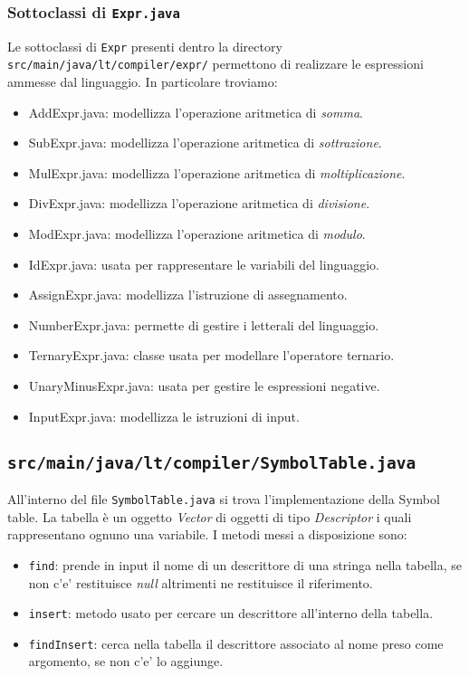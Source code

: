 \documentclass[10pt,a4paper]{article}
\begin{document}
\subsubsection{Sottoclassi di \texttt{Expr.java}}
Le sottoclassi di \texttt{Expr} presenti dentro la directory \texttt{src/main/java/lt/compiler/expr/} permettono di realizzare le espressioni ammesse dal linguaggio. In particolare troviamo:
\begin{itemize}
    \item AddExpr.java: modellizza l'operazione aritmetica di \textit{somma}.
    \item SubExpr.java: modellizza l'operazione aritmetica di \textit{sottrazione}.
    \item MulExpr.java: modellizza l'operazione aritmetica di \textit{moltiplicazione}.
    \item DivExpr.java: modellizza l'operazione aritmetica di \textit{divisione}.
    \item ModExpr.java: modellizza l'operazione aritmetica di \textit{modulo}.
    \item IdExpr.java: usata per rappresentare le variabili del linguaggio.
    \item AssignExpr.java: modellizza l'istruzione di assegnamento. 
    \item NumberExpr.java: permette di gestire i letterali del linguaggio.
    \item TernaryExpr.java: classe usata per modellare l'operatore ternario.
    \item UnaryMinusExpr.java: usata per gestire le espressioni negative. 
    \item InputExpr.java: modellizza le istruzioni di input.
\end{itemize}

\subsection{\texttt{src/main/java/lt/compiler/SymbolTable.java}}
All'interno del file \texttt{SymbolTable.java} si trova l'implementazione della Symbol table. La tabella è un oggetto \textit{Vector} di oggetti di tipo \textit{Descriptor} i quali rappresentano ognuno una variabile. I metodi messi a disposizione sono:
\begin{itemize}
\item \texttt{find}: prende in input il nome di un descrittore di una stringa nella tabella, se non c'e' restituisce \textit{null} altrimenti ne restituisce il riferimento.
\item \texttt{insert}: metodo usato per cercare un descrittore all'interno della tabella.
\item \texttt{findInsert}: cerca nella tabella il descrittore associato al nome preso come argomento, se non c'e' lo aggiunge.
\end{itemize}
\pagebreak
\end{document}
